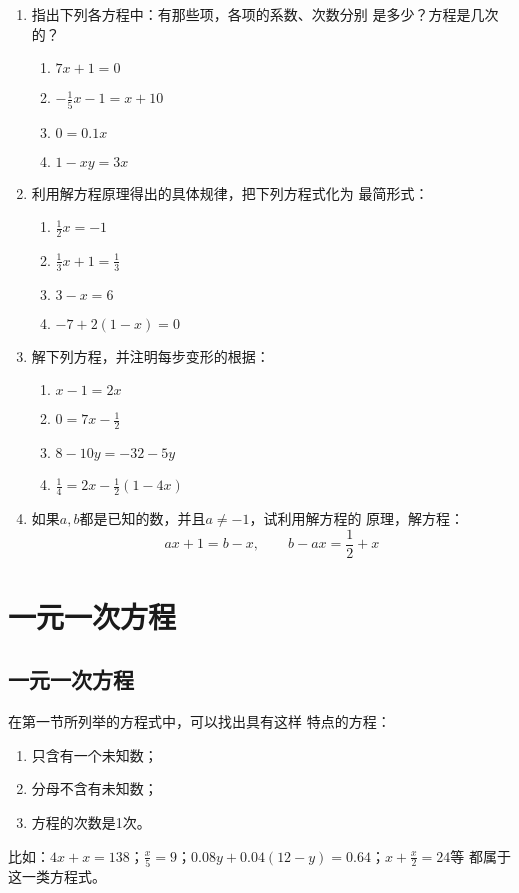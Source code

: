\begin{enumerate}
\item 指出下列各方程中：有那些项，各项的系数、次数分别
是多少？方程是几次的？
\begin{multicols}{2}
\begin{enumerate}
    \item $7x+1=0$
    \item $-\frac{1}{5}x-1=x+10$
    \item $0=0.1x$
    \item $1-xy=3x$
\end{enumerate}
\end{multicols}

\item  利用解方程原理得出的具体规律，把下列方程式化为
最简形式：
\begin{multicols}{2}
\begin{enumerate}
    \item $\frac{1}{2}x=-1$
    \item $\frac{1}{3}x+1=\frac{1}{3}$
    \item $3-x=6$
    \item $-7+2(1-x)=0$
\end{enumerate}
\end{multicols}

\item  解下列方程，并注明每步变形的根据：
\begin{multicols}{2}
    \begin{enumerate}
        \item $x-1=2x$
        \item $0=7x-\frac{1}{2}$
        \item $8-10y=-32-5y$
        \item $\frac{1}{4}=2x-\frac{1}{2}(1-4x)$
    \end{enumerate}
    \end{multicols}

\item  如果$a,  b$都是已知的数，并且$a\ne -1$，试利用解方程的
原理，解方程：
\[ax+1=b-x,\qquad b-ax=\frac{1}{2}+x   \]

\end{enumerate}

\section{一元一次方程}
\subsection{一元一次方程}
    在第一节所列举的方程式中，可以找出具有这样
特点的方程：
\begin{enumerate}
    \item 只含有一个未知数；
    \item 分母不含有未知数；
    \item 方程的次数是1次。
\end{enumerate}
比如：$4x+x = 138$；$\frac{x}{5}=9$；$0.08y+0.04(12-y)=0.64$；$x+\frac{x}{2}=24$等
都属于这一类方程式。

